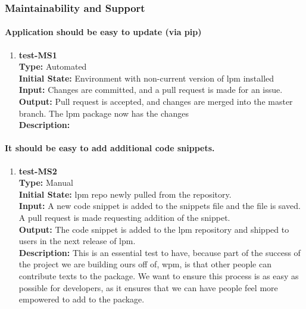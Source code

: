 \documentclass[12pt, titlepage]{article}
\begin{document}
\subsubsection{Maintainability and Support}
\paragraph{Application should be easy to update (via pip)}
\begin{enumerate}
    \item{\textbf{test-MS1}\\}
    \textbf{Type:} Automated\\
    \textbf{Initial State:} Environment with non-current version of lpm installed\\
    \textbf{Input:} Changes are committed, and a pull request is made for an issue.\\
    \textbf{Output:} Pull request is accepted, and changes are merged into the master branch. The lpm package now has the changes\\
    \textbf{Description:}\\
\end{enumerate}

\paragraph{ It should be easy to add additional code snippets.}
\begin{enumerate}
    \item{\textbf{test-MS2}\\}
    \textbf{Type:} Manual\\
    \textbf{Initial State:} lpm repo newly pulled from the repository. \\
    \textbf{Input:} A new code snippet is added to the snippets file and the file is saved. A pull request is made requesting addition of the snippet.\\
    \textbf{Output:} The code snippet is added to the lpm repository and shipped to users in the next release of lpm. \\
    \textbf{Description:} This is an essential test to have, because part of the success of the project we are building ours off of, wpm, is that other people can contribute texts to the package. We want to ensure this process is as easy as possible for developers, as it ensures that we can have people feel more empowered to add to the package. \\
\end{enumerate}
\end{document}
